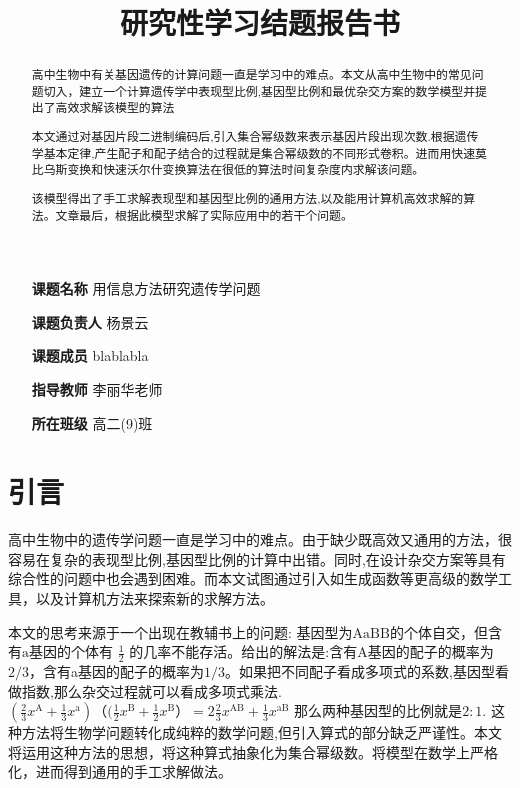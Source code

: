 \documentclass{article}
\title{研究性学习结题报告书}
\author{}
\begin{document}
\maketitle

\begin{itemize}
    \item[\textbf{课题名称}] 用信息方法研究遗传学问题 \centering
    \item[\textbf{课题负责人}] 杨景云
    \item[\textbf{课题成员}] blablabla
    \item[\textbf{指导教师}] 李丽华老师
    \item[\textbf{所在班级}] 高二(9)班
\end{itemize}

\begin{abstract}
    高中生物中有关基因遗传的计算问题一直是学习中的难点。本文从高中生物中的常见问题切入，建立一个计算遗传学中表现型比例,基因型比例和最优杂交方案的数学模型并提出了高效求解该模型的算法
    
    本文通过对基因片段二进制编码后,引入集合幂级数来表示基因片段出现次数.根据遗传学基本定律,产生配子和配子结合的过程就是集合幂级数的不同形式卷积。进而用快速莫比乌斯变换和快速沃尔什变换算法在很低的算法时间复杂度内求解该问题。
    
    该模型得出了手工求解表现型和基因型比例的通用方法,以及能用计算机高效求解的算法。文章最后，根据此模型求解了实际应用中的若干个问题。
\end{abstract}

\newpage

\tableofcontents %

\newpage

\section{引言}

高中生物中的遗传学问题一直是学习中的难点。由于缺少既高效又通用的方法，很容易在复杂的表现型比例,基因型比例的计算中出错。同时,在设计杂交方案等具有综合性的问题中也会遇到困难。而本文试图通过引入如生成函数等更高级的数学工具，以及计算机方法来探索新的求解方法。

本文的思考来源于一个出现在教辅书上的问题: 基因型为$\text{AaBB}$的个体自交，但含有$\text{a}$基因的个体有 $\frac{1}{2} $ 的几率不能存活。给出的解法是:含有A基因的配子的概率为$2/3$，含有a基因的配子的概率为$1/3$。如果把不同配子看成多项式的系数,基因型看做指数,那么杂交过程就可以看成多项式乘法. 
$(\frac{2}{3}x^{\text{A}}+\frac{1}{3} x^{\text{a}})（(\frac{1}{2}x^{\text{B}}+\frac{1}{2}x^{\text{B}}）=2\frac{2}{3}x^{\text{AB}}+\frac{1}{3}x^{\text{aB}}$ 那么两种基因型的比例就是$2:1$. 这种方法将生物学问题转化成纯粹的数学问题,但引入算式的部分缺乏严谨性。本文将运用这种方法的思想，将这种算式抽象化为集合幂级数。将模型在数学上严格化，进而得到通用的手工求解做法。
\end{document}

